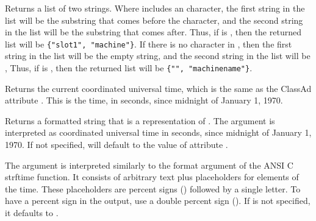 \begin{description}
  \item[\Code{List splitSlotName(String Name)}]
    Returns a list of two strings.
    Where  includes an  character,
    the first string in the list will be the substring that comes before
    the  character, 
    and the second string in the list will be the substring that comes after.
    Thus, if  is , then the returned list
    will be \verb|{"slot1", "machine"}|.
    If there is no  character in ,
    then the first string in the list will be the empty string,
    and the second string in the list will be , 
    Thus, if  is , then the returned list
    will be \verb|{"", "machinename"}|.

  \item[\Code{Integer time()}]
    Returns the current coordinated universal time, which is the same
    as the ClassAd attribute .
    This is the time, in seconds, since midnight of January 1, 1970.

  \item[\Code{String formatTime(\Lbr\ Integer time \Rbr\ \Lbr\ , String format \Rbr)}]

    Returns a formatted string that is a representation of .
    The argument  is interpreted as coordinated universal time in
    seconds, since midnight of January 1, 1970. If not specified,
     will default to the value of attribute .
		
    The argument  is interpreted similarly to the format
    argument of the ANSI C strftime function. It consists of arbitrary text
    plus placeholders for elements of the time. These placeholders are
    percent signs (\Percent) followed by a single letter.
    To have a percent sign in
    the output, use a double percent sign (\Percent\Percent).  If
     is not specified, it defaults to .


\end{description}
